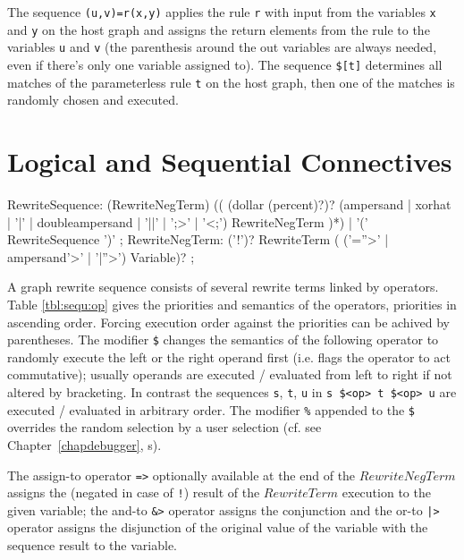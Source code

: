 \begin{example}
The sequence \verb#(u,v)=r(x,y)# applies the rule \texttt{r} with input from the variables \texttt{x} and \texttt{y} on the host graph 
and assigns the return elements from the rule to the variables \texttt{u} and \texttt{v} (the parenthesis around the out variables are always needed, even if there's only one variable assigned to).
The sequence \verb#$[t]# determines all matches of the parameterless rule \texttt{t} on the host graph, then one of the matches is randomly chosen and executed.
\end{example}


\section{Logical and Sequential Connectives}

\makeatletter

\begin{rail}
  RewriteSequence: 
    (RewriteNegTerm) (( (dollar (percent)?)? (ampersand | xorhat | '|' | doubleampersand | '||' | ';>' | '<;') RewriteNegTerm )*)
|    '(' RewriteSequence ')'
	;
  RewriteNegTerm: 
    ('!')? RewriteTerm ( ('=''>' | ampersand'>' | '|''>') Variable)?
	;
\end{rail}

A graph rewrite sequence consists of several rewrite terms linked by operators.
Table \ref{tbl:sequ:op} gives the priorities and semantics of the operators, priorities in ascending order.
Forcing execution order against the priorities can be achived by parentheses.
The modifier \texttt{\$} changes the semantics of the following operator to randomly execute the left or the right operand first (i.e. flags the operator to act commutative);
usually operands are executed / evaluated from left to right if not altered by bracketing.
In contrast the sequences \texttt{s}, \texttt{t}, \texttt{u} in \texttt{s \$<op> t \$<op> u} are executed / evaluated in arbitrary order.
The modifier \texttt{\%} appended to the \texttt{\$} overrides the random selection by a user selection (cf. see Chapter~\ref{chapdebugger}, s).

The assign-to operator \texttt{=>} optionally available at the end of the $RewriteNegTerm$ assigns the (negated in case of \texttt{!}) result of the $RewriteTerm$ execution to the given variable; the and-to \texttt{\&>} operator assigns the conjunction and the or-to \texttt{|>} operator assigns the disjunction of the original value of the variable with the sequence result to the variable.

